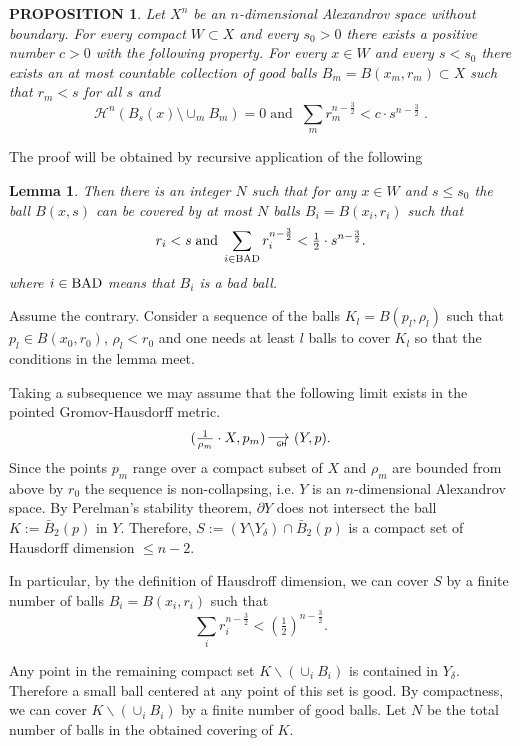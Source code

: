 \documentclass[12pt,leqno]{amsart}
\numberwithin{equation}{section}
\newtheorem{lem}[thm]{Lemma}
\newtheorem{prop}[thm]{PROPOSITION}
\theoremstyle{definition}
\theoremstyle{remark}
\def\BAD{\mathop{\rm BAD}\nolimits}%
\newcommand*{\GHto}{\mathbin{\begin{picture}(16,3.5)
\put(-1,1){$\longrightarrow$}
\put(13,-3){\llap{\text{\sf\tiny GH}}}
\end{picture}}}
\def\parit#1{\medskip\noindent{\it #1}}
\begin{document}
\begin{prop}\label{prop:covering}
Let $X^n$ be an $n$-dimensional Alexandrov space without boundary.  For every compact $W\subset X$ and every $s_0>0$   there exists
a positive number $c>0$ with the following property. For every $x\in W$ and every $s<s_0$
 there exists an at most countable collection of good balls $B_m=B(x_m,r_m) \subset X$
such that $r_m<s$ for all $s$ and
$$ \mathcal H^n (B_s (x) \setminus \cup _m B_m)=0  \;   \text{and}  \; \; \sum_m r_m^{n-\frac32}< c \cdot s^{n-\frac 3 2}\;.$$
\end{prop}

The proof will be  obtained by recursive application of the following

\begin{lem}\label{lem:covering}
Then there is an integer $N$ such that for any $x\in W$ and $s \leq s_0$
the ball $B(x,s)$ can be covered by at most $N$ balls
 $B_i=B(x_i,r_i)$ such that
$$r_i< s \; \text{and} \;  \sum_{i\in \BAD}r_i^{n-\frac32}< \tfrac12\cdot s^{n-\frac32}.$$
where $i\in \BAD$ means that $B_i$ is a bad ball.
\end{lem}

\parit{Proof.}
Assume the contrary. Consider  a sequence of the balls
$K_l=B(p_l,\rho_l)$
such that $p_l\in B(x_0,r_0)$,
$\rho_l<r_0$ and
one needs at least $l$ balls to cover $K_l$ so that the conditions in the lemma meet.

Taking a subsequence we may assume that the following limit exists in the pointed Gromov-Hausdorff metric.
$$(\tfrac1{\rho_m}\cdot X,p_m)\GHto (Y,p).$$
Since the points $p_m$ range over a compact subset of $X$ and $\rho _m$ are bounded from above by $r_0$ the
sequence is non-collapsing, i.e. $Y$ is an $n$-dimensional Alexandrov space.
By Perelman's stability theorem, $\partial Y$  does not intersect the ball $K:= \bar B_2 (p)$ in $Y$.
Therefore,  $S:= (Y\setminus Y_{\delta} ) \cap \bar B_2 (p)$ is a compact set of   Hausdorff dimension $\le n-2$.

In particular, by the definition of Hausdroff dimension, we can cover $S$ by a finite number of balls
$B_i=B(x_i,r_i)$ such that
$$\sum_ir_i^{n-\frac32} < (\tfrac12)^{n-\frac32}.$$


Any point in the remaining compact set $K\backslash (\cup_i B_i)$
is contained  in $Y_{\delta}$. Therefore a small ball centered at any point of this set is good.
By compactness, we can cover $K\backslash (\cup_i B_i)$ by a finite number of good balls.
Let $N$ be the total number of balls in the obtained covering of $K$.
\end{document}
